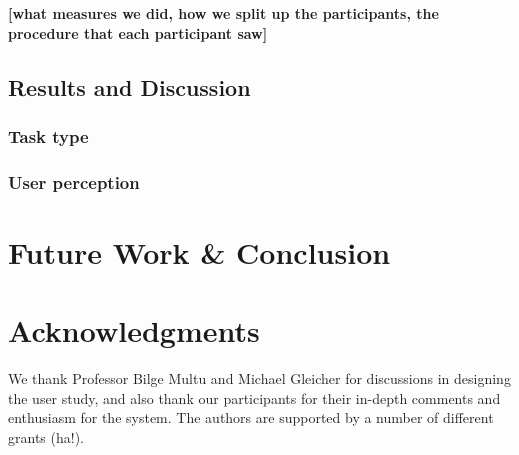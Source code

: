 \documentclass{sigchi}
\newcommand\tabhead[1]{\small\textbf{#1}}
\begin{document}
\textbf{[what measures we did, how we split up the participants, the procedure that each participant saw]}

\subsection{Results and Discussion}
\subsubsection{Task type}

\subsubsection{User perception}

\section{Future Work \& Conclusion}





\section{Acknowledgments}

We thank Professor Bilge Multu and Michael Gleicher for discussions in designing the user study, and also thank our participants for their in-depth comments and enthusiasm for the system.  The authors are supported by a number of different grants (ha!).
\end{document}
